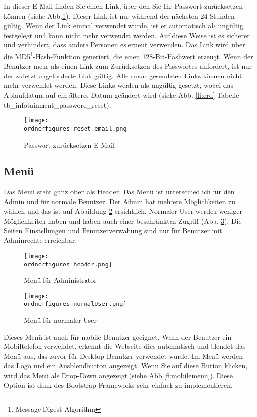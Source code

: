 In dieser E-Mail finden Sie einen Link, über den Sie Ihr Passwort zurücksetzen können (siehe Abb.\ref{fi:resetemail}). Dieser Link ist nur während der nächsten 24 Stunden gültig. Wenn der Link einmal verwendet wurde, ist er automatisch als ungültig festgelegt und kann nicht mehr verwendet werden. Auf diese Weise ist es sicherer und verhindert, dass andere Personen es erneut verwenden. Das Link wird über die MD5\footnote{Message-Digest Algorithm }-Hash-Funktion generiert, die einen 128-Bit-Hashwert erzeugt. Wenn der Benutzer mehr als einen Link zum Zurücksetzen des Passwortes anfordert, ist nur der zuletzt angeforderte Link gültig. Alle zuvor gesendeten Links können nicht mehr verwendet werden. Diese Links werden als ungültig gesetzt, wobei das Ablaufdatum auf ein älteres Datum geändert wird (siehe Abb. \ref{fi:erd} Tabelle tb\_infotainment\_password\_reset).

\begin{figure}[H]
	\centering
	\texttt{[image: \\ordnerfigures reset-email.png]}
	\caption{Passwort zurücksetzen E-Mail}
	\label{fi:resetemail}
\end{figure}


\subsection{Menü}

Das Menü steht ganz oben als Header. Das Menü ist unterschiedlich für den Admin und für normale Benutzer. Der Admin hat mehrere Möglichkeiten zu wählen und das ist auf Abbildung \ref{fi:menu} ersichtlich. Normaler User werden weniger Möglichkeiten haben und haben auch einer beschränkten Zugriff (Abb. \ref{fi:normalerUser}). Die Seiten Einstellungen und Benutzerverwaltung sind nur für Benutzer mit Adminrechte erreichbar. 

\begin{figure}[H]
	\centering
	\texttt{[image: \\ordnerfigures header.png]}
	\caption{Men\"u für Administrator}
	\label{fi:menu}
\end{figure}

\begin{figure}[H]
	\centering
	\texttt{[image: \\ordnerfigures normalUser.png]}
	\caption{Men\"u für normaler User}
	\label{fi:normalerUser}
\end{figure}

Dieses Menü ist auch für mobile Benutzer geeignet. Wenn der Benutzer ein Mobiltelefon verwendet, erkennt die Webseite dies automatisch und blendet das Menü aus, das zuvor für Desktop-Benutzer verwendet wurde. Im Menü werden das Logo und ein Ausblendbutton angezeigt. Wenn Sie auf diese Button klicken, wird das Menü als Drop-Down angezeigt (siehe Abb.\ref{fi:mobilemenu}). Diese Option ist dank des Bootstrap-Frameworks sehr einfach zu implementieren.
	
